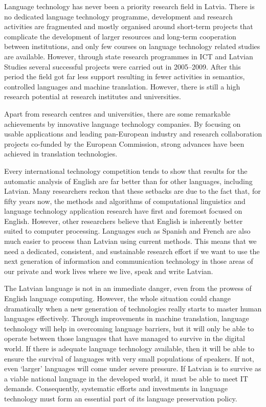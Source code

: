 \begin{multicols}{2}
Language technology has never been a priority research field in Latvia.  There is no dedicated language technology programme, development and research activities are fragmented and mostly organised around short-term projects that complicate the development of larger resources and long-term cooperation between institutions, and only few courses on language technology related studies are available.  However, through state research programmes in ICT and Latvian Studies several successful projects were carried out in 2005--2009.  After this period the field got far less support resulting in fewer activities in semantics, controlled languages and machine translation.  However, there is still a high research potential at research institutes and universities.

Apart from research centres and universities, there are some remarkable achievements by innovative language technology companies.
By focusing on usable applications and leading pan-European industry and research collaboration projects co-funded by the European Commission, strong advances have been achieved in translation technologies.

Every international technology competition tends to show that results for the automatic analysis of English are far better than for other languages, including Latvian.
Many researchers reckon that these setbacks are due to the fact that, for fifty years now, the methods and algorithms of computational linguistics and language technology application research have first and foremost focused on English.
However, other researchers believe that English is inherently better suited to computer processing.
Languages such as Spanish and French are also much easier to process than Latvian using current methods.
This means that we need a dedicated, consistent, and sustainable research effort if we want to use the next generation of information and communication technology in those areas of our private and work lives where we live, speak and write Latvian.

The Latvian language is not in an immediate danger, even from the prowess of English language computing.
However, the whole situation could change dramatically when a new generation of technologies really starts to master human languages effectively.
Through improvements in machine translation, language technology will help in overcoming language barriers, but it will only be able to operate between those languages that have managed to survive in the digital world.
If there is adequate language technology available, then it will be able to ensure the survival of languages with very small populations of speakers.
If not, even ‘larger’ languages will come under severe pressure.
If Latvian is to survive as a viable national language in the developed world, it must be able to meet IT demands.
Consequently, systematic efforts and investments in language technology must form an essential part of its language preservation policy.
\end{multicols}

